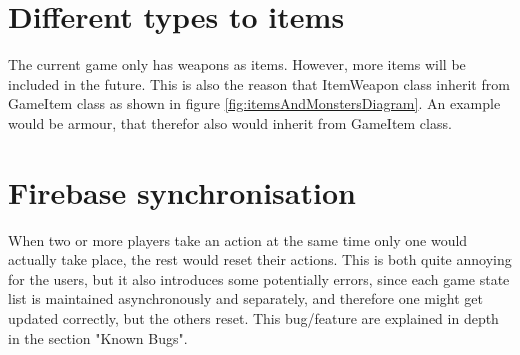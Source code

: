 \section{Different types to items}
The current game only has weapons as items. However, more items will be included in the future. This is also the reason that ItemWeapon class inherit from GameItem class as shown in figure \ref{fig:itemsAndMonstersDiagram}. An example would be armour, that therefor also would inherit from GameItem class.

\section{Firebase synchronisation}
When two or more players take an action at the same time only one would actually take place, the rest would reset their actions. This is both quite annoying for the users, but it also introduces some potentially errors, since each game state list is maintained asynchronously  and separately, and therefore one might get updated correctly, but the others reset. This bug/feature are explained in depth in the section "Known Bugs". 